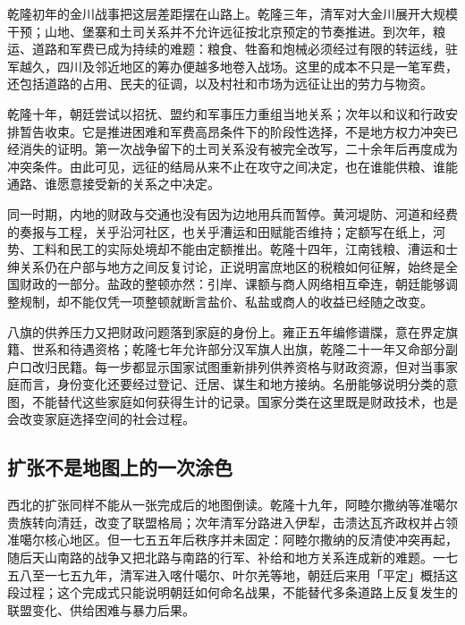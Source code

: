 乾隆初年的金川战事把这层差距摆在山路上。乾隆三年，清军对大金川展开大规模干预；山地、堡寨和土司关系并不允许远征按北京预定的节奏推进。到次年，粮运、道路和军费已成为持续的难题：粮食、牲畜和炮械必须经过有限的转运线，驻军越久，四川及邻近地区的筹办便越多地卷入战场。这里的成本不只是一笔军费，还包括道路的占用、民夫的征调，以及村社和市场为远征让出的劳力与物资。

乾隆十年，朝廷尝试以招抚、盟约和军事压力重组当地关系；次年以和议和行政安排暂告收束。它是推进困难和军费高昂条件下的阶段性选择，不是地方权力冲突已经消失的证明。第一次战争留下的土司关系没有被完全改写，二十余年后再度成为冲突条件。由此可见，远征的结局从来不止在攻守之间决定，也在谁能供粮、谁能通路、谁愿意接受新的关系之中决定。

同一时期，内地的财政与交通也没有因为边地用兵而暂停。黄河堤防、河道和经费的奏报与工程，关乎沿河社区，也关乎漕运和田赋能否维持；定额写在纸上，河势、工料和民工的实际处境却不能由定额推出。乾隆十四年，江南钱粮、漕运和士绅关系仍在户部与地方之间反复讨论，正说明富庶地区的税粮如何征解，始终是全国财政的一部分。盐政的整顿亦然：引岸、课额与商人网络相互牵连，朝廷能够调整规制，却不能仅凭一项整顿就断言盐价、私盐或商人的收益已经随之改变。

八旗的供养压力又把财政问题落到家庭的身份上。雍正五年编修谱牒，意在界定旗籍、世系和待遇资格；乾隆七年允许部分汉军旗人出旗，乾隆二十一年又命部分副户口改归民籍。每一步都显示国家试图重新排列供养资格与财政资源，但对当事家庭而言，身份变化还要经过登记、迁居、谋生和地方接纳。名册能够说明分类的意图，不能替代这些家庭如何获得生计的记录。国家分类在这里既是财政技术，也是会改变家庭选择空间的社会过程。

\subsection{扩张不是地图上的一次涂色}

西北的扩张同样不能从一张完成后的地图倒读。乾隆十九年，阿睦尔撒纳等准噶尔贵族转向清廷，改变了联盟格局；次年清军分路进入伊犁，击溃达瓦齐政权并占领准噶尔核心地区。但一七五五年后秩序并未固定：阿睦尔撒纳的反清使冲突再起，随后天山南路的战争又把北路与南路的行军、补给和地方关系连成新的难题。一七五八至一七五九年，清军进入喀什噶尔、叶尔羌等地，朝廷后来用「平定」概括这段过程；这个完成式只能说明朝廷如何命名战果，不能替代多条道路上反复发生的联盟变化、供给困难与暴力后果。

